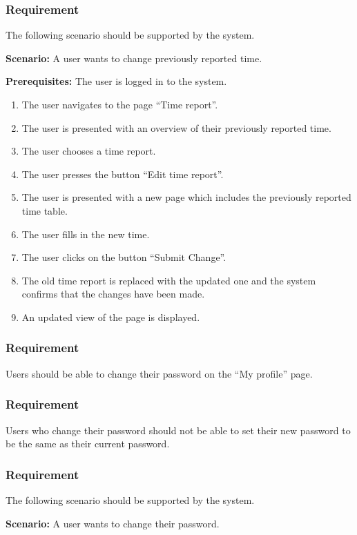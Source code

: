 \documentclass{article}
\begin{document}
\subsubsection{Requirement}
The following scenario should be supported by the system.

\textbf{Scenario:} A user wants to change previously reported time.

\textbf{Prerequisites:} The user is logged in to the system.

\begin{enumerate}

\item The user navigates to the page “Time report”.
\item The user is presented with an overview of their previously reported time. 
\item The user chooses a time report.
\item The user presses the button “Edit time report”.
\item The user is presented with a new page which includes the previously reported time table. 
\item The user fills in the new time.
\item The user clicks on the button “Submit Change”.
\item The old time report is replaced with the updated one and the system confirms that the changes have been made.  
\item An updated view of the page is displayed.

\end{enumerate}

\subsubsection{Requirement}
Users should be able to change their password on the “My profile” page.
\subsubsection{Requirement}
Users who change their password should not be able to set their new password to be the same as their current password.

\subsubsection{Requirement}
The following scenario should be supported by the system.

\textbf{Scenario:} A user wants to change their password.
\end{document}
